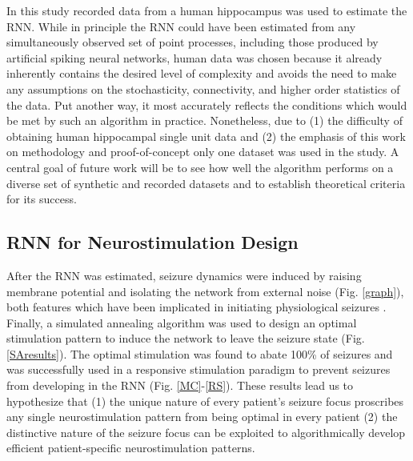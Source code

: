 \documentclass[11pt,a4paper,final]{article}
\begin{document}
In this study recorded data from a human hippocampus was used to estimate the RNN. 
While in principle the RNN could have been estimated from any simultaneously observed set of point processes, including those produced by artificial spiking neural networks, human data was chosen because it already inherently contains the desired level of complexity and avoids the need to make any assumptions on the stochasticity, connectivity, and higher order statistics of the data. 
Put another way, it most accurately reflects the conditions which would be met by such an algorithm in practice. 
Nonetheless, due to (1) the difficulty of obtaining human hippocampal single unit data and (2) the emphasis of this work on methodology and proof-of-concept only one dataset was used in the study. 
A central goal of future work will be to see how well the algorithm performs on a diverse set of synthetic and recorded datasets and to establish theoretical criteria for its success. 

\subsection{RNN for Neurostimulation Design}

After the RNN was estimated, seizure dynamics were induced by raising membrane potential and isolating the network from external noise (Fig. \ref{graph}), both features which have been implicated in initiating physiological seizures \citep{fricker99,wendling03,warren10}.
Finally, a simulated annealing algorithm was used to design an optimal stimulation pattern to induce the network to leave the seizure state (Fig. \ref{SAresults}).
The optimal stimulation was found to abate 100\% of seizures and was  successfully used in a responsive stimulation paradigm to prevent seizures from developing in the RNN (Fig. \ref{MC}-\ref{RS}).
These results lead us to hypothesize that (1) the unique nature of every patient's seizure focus proscribes any single neurostimulation pattern from being optimal in every patient (2) the distinctive nature of the seizure focus can be exploited to algorithmically develop efficient patient-specific neurostimulation patterns.
\end{document}
